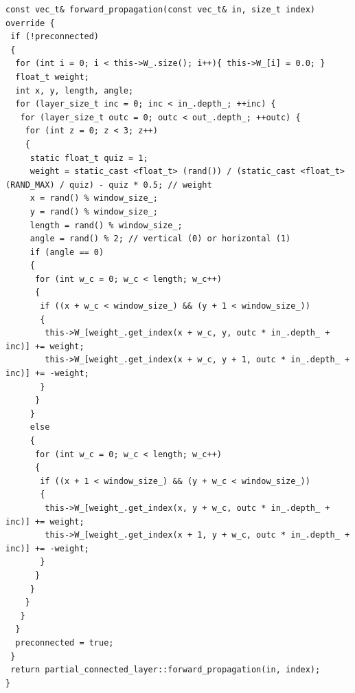 \documentclass[utf8,usehyperref,14pt]{G7-32}
\begin{document}
\label{matinit}
\begin{lstlisting}
const vec_t& forward_propagation(const vec_t& in, size_t index) override {
 if (!preconnected)
 {
  for (int i = 0; i < this->W_.size(); i++){ this->W_[i] = 0.0; }
  float_t weight;
  int x, y, length, angle;
  for (layer_size_t inc = 0; inc < in_.depth_; ++inc) {
   for (layer_size_t outc = 0; outc < out_.depth_; ++outc) {
    for (int z = 0; z < 3; z++)
    {
     static float_t quiz = 1;
     weight = static_cast <float_t> (rand()) / (static_cast <float_t> (RAND_MAX) / quiz) - quiz * 0.5; // weight
     x = rand() % window_size_;
     y = rand() % window_size_;
     length = rand() % window_size_;
     angle = rand() % 2; // vertical (0) or horizontal (1)
     if (angle == 0)
     {
      for (int w_c = 0; w_c < length; w_c++)
      {
       if ((x + w_c < window_size_) && (y + 1 < window_size_))
       {	
        this->W_[weight_.get_index(x + w_c, y, outc * in_.depth_ + inc)] += weight;	
        this->W_[weight_.get_index(x + w_c, y + 1, outc * in_.depth_ + inc)] += -weight;
       }
      }
     }
     else
     {
      for (int w_c = 0; w_c < length; w_c++)
      {
       if ((x + 1 < window_size_) && (y + w_c < window_size_))
       {
        this->W_[weight_.get_index(x, y + w_c, outc * in_.depth_ + inc)] += weight;
        this->W_[weight_.get_index(x + 1, y + w_c, outc * in_.depth_ + inc)] += -weight;
       }
      }
     }
    }
   }
  }
  preconnected = true;
 }
 return partial_connected_layer::forward_propagation(in, index);
}

\end{lstlisting}
\end{document}
